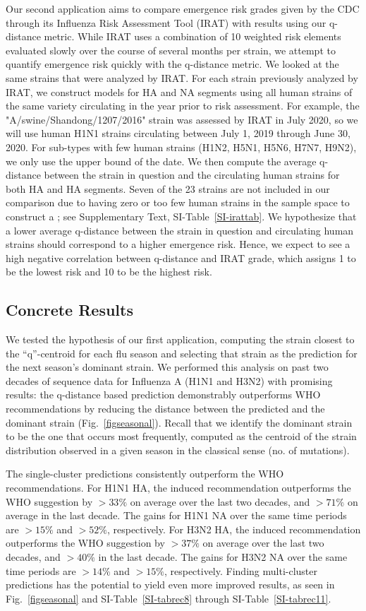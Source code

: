 \documentclass[onecolumn, compsoc,10pt]{IEEEtran}
\begin{document}
Our second application aims to compare emergence risk grades given by the CDC through its Influenza Risk Assessment Tool (IRAT) with results using our q-distance metric. While IRAT uses a combination of 10 weighted risk elements evaluated slowly over the course of several months per strain, we attempt to quantify emergence risk quickly with the q-distance metric. We looked at the same strains that were analyzed by IRAT. For each strain previously analyzed by IRAT, we construct \qnet models for HA and NA segments using all human strains of the same variety circulating in the year prior to risk assessment. For example, the "A/swine/Shandong/1207/2016" strain was assessed by IRAT in July 2020, so we will use human H1N1 strains circulating between July 1, 2019 through June 30, 2020. For sub-types with few human strains (H1N2, H5N1, H5N6, H7N7, H9N2), we only use the upper bound of the date. We then compute the average q-distance between the strain in question and the circulating human strains for both HA and HA segments. Seven of the 23 strains are not included in our comparison due to having zero or too few human strains in the sample space to construct a \qnet; see Supplementary Text, SI-Table~\ref{SI-irattab}. We hypothesize that a lower average q-distance between the strain in question and circulating human strains should correspond to a higher emergence risk. Hence, we expect to see a high negative correlation between q-distance and IRAT grade, which assigns 1 to be the lowest risk and 10 to be the highest risk.

\subsection*{Concrete Results} 

We tested the hypothesis of our first application, computing the strain closest to the ``q''-centroid for each flu season and selecting that strain as the prediction for the next season's dominant strain. We performed this analysis on past two decades of sequence data for Influenza A (H1N1 and H3N2) with promising results: the q-distance based prediction demonstrably outperforms WHO recommendations by reducing  the  distance between the predicted and  the dominant  strain (Fig.~\ref{figseasonal}). Recall that we identify the dominant strain to be the one that occurs most frequently, computed as the centroid of the strain distribution observed in a given season in the classical sense (no. of mutations).

The \qnet single-cluster predictions consistently outperform the WHO recommendations. For H1N1 HA, the \qnet induced recommendation outperforms the WHO suggestion by $>33\%$ on average over the last two decades, and $>71\%$ on average in the last decade. The gains for H1N1 NA over the same time periods are $>15\%$ and $>52\%$, respectively. For H3N2 HA, the \qnet induced recommendation outperforms the WHO suggestion by $>37\%$ on average over the last two decades, and $>40\%$ in the last decade. The gains for H3N2 NA over the same time periods are $>14\%$ and $>15\%$, respectively. Finding multi-cluster predictions has the potential to yield even more improved results, as seen in Fig.~\ref{figseasonal} and SI-Table~\ref{SI-tabrec8} through SI-Table~\ref{SI-tabrec11}.
\end{document}
